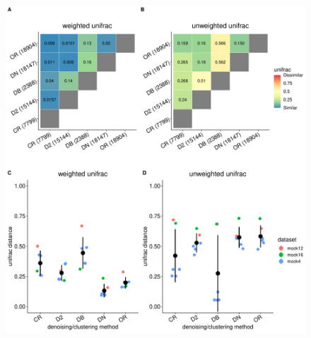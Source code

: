 \documentclass[letterpaper,12pt]{article}
\providecommand{\DIFaddbeginFL}{} %
\newcommand{\DIFaddincludegraphics}[2][]{{\color{blue}\fbox{\DIFOincludegraphics[#1]{#2}}}} %
\DeclareRobustCommand{\DIFaddbeginFL}{\DIFOaddbeginFL \let\includegraphics\DIFaddincludegraphics} %
\begin{document}
  \begin{figure}
    \centering
    \includegraphics[width=\textwidth]{figure3.pdf}
  \DIFaddbeginFL \end{figure}
\end{document}
